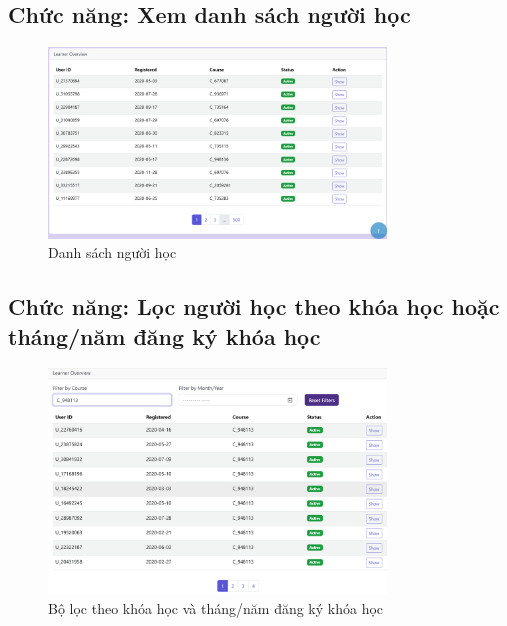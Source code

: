 \subsection{Chức năng: Xem danh sách người học}
\begin{figure}[H]
    \centering
    \includegraphics[width = 0.8\textwidth]{imgs/demo-1.png}
    \caption{Danh sách người học}
    \label{fig:demo-1}
\end{figure}
\subsection{Chức năng: Lọc người học theo khóa học hoặc tháng/năm đăng ký khóa học}
\begin{figure}[H]
    \centering
    \includegraphics[width = 0.8\textwidth]{imgs/demo-filter.png}
    \caption{Bộ lọc theo khóa học và tháng/năm đăng ký khóa học}
    \label{fig:demo-filter}
\end{figure}
